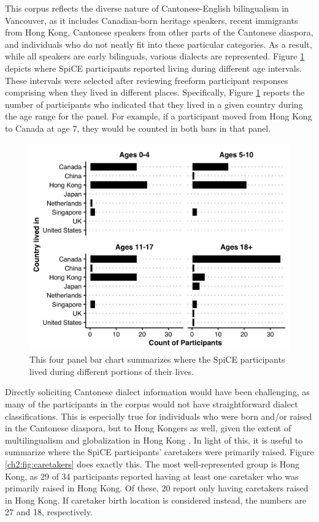 This corpus reflects the diverse nature of Cantonese-English bilingualism in Vancouver, as it includes Canadian-born heritage speakers, recent immigrants from Hong Kong, Cantonese speakers from other parts of the Cantonese diaspora, and individuals who do not neatly fit into these particular categories. As a result, while all speakers are early bilinguals, various dialects are represented. Figure \ref{ch2:fig:placeslived} depicts where SpiCE participants reported living during different age intervals. These intervals were selected after reviewing freeform participant responses comprising when they lived in different places. Specifically, Figure \ref{ch2:fig:placeslived} reports the number of participants who indicated that they lived in a given country during the age range for the panel. For example, if a participant moved from Hong Kong to Canada at age 7, they would be counted in both bars in that panel. 

\begin{figure}[!htbp]
  \begin{center}
  \includegraphics[width=4.9in]{figures/ch2_placeslived_5in.png} 
  \caption{This four panel bar chart summarizes where the SpiCE participants lived during different portions of their lives.}
  \label{ch2:fig:placeslived}
  \end{center}
\end{figure}

Directly soliciting Cantonese dialect information would have been challenging, as many of the participants in the corpus would not have straightforward dialect classifications. This is especially true for individuals who were born and/or raised in the Cantonese diaspora, but to Hong Kongers as well, given the extent of multilingualism and globalization in Hong Kong \citep{bolton_2020_societal}. In light of this, it is useful to summarize where the SpiCE participants' caretakers were primarily raised. Figure \ref{ch2:fig:caretakers} does exactly this. The most well-represented group is Hong Kong, as 29 of 34 participants reported having at least one caretaker who was primarily raised in Hong Kong. Of these, 20 report only having caretakers raised in Hong Kong. If caretaker birth location is considered instead, the numbers are 27 and 18, respectively. 

